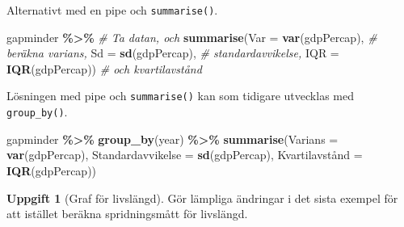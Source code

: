 \documentclass[
]{book}
\newenvironment{Shaded}{\begin{snugshade}}{\end{snugshade}}
\newcommand{\AttributeTok}[1]{\textcolor[rgb]{0.13,0.29,0.53}{#1}}
\newcommand{\CommentTok}[1]{\textcolor[rgb]{0.56,0.35,0.01}{\textit{#1}}}
\newcommand{\FunctionTok}[1]{\textcolor[rgb]{0.13,0.29,0.53}{\textbf{#1}}}
\newcommand{\NormalTok}[1]{#1}
\newcommand{\OtherTok}[1]{\textcolor[rgb]{0.56,0.35,0.01}{#1}}
\newcommand{\SpecialCharTok}[1]{\textcolor[rgb]{0.81,0.36,0.00}{\textbf{#1}}}
\theoremstyle{definition}
\theoremstyle{definition}
\theoremstyle{definition}
\newtheorem{exercise}{Uppgift}[chapter]
\theoremstyle{definition}
\theoremstyle{remark}
\begin{document}
\begin{Shaded}
\end{Shaded}

Alternativt med en pipe och \texttt{summarise()}.

\begin{Shaded}
\begin{Highlighting}[]
\NormalTok{gapminder }\SpecialCharTok{\%\textgreater{}\%}                       \CommentTok{\# Ta datan, och}
  \FunctionTok{summarise}\NormalTok{(}\AttributeTok{Var =} \FunctionTok{var}\NormalTok{(gdpPercap),   }\CommentTok{\# beräkna varians,}
            \AttributeTok{Sd =} \FunctionTok{sd}\NormalTok{(gdpPercap),     }\CommentTok{\# standardavvikelse,}
            \AttributeTok{IQR =} \FunctionTok{IQR}\NormalTok{(gdpPercap))   }\CommentTok{\# och kvartilavstånd}
\end{Highlighting}
\end{Shaded}

Lösningen med pipe och \texttt{summarise()} kan som tidigare utvecklas med \texttt{group\_by()}.

\begin{Shaded}
\begin{Highlighting}[]
\NormalTok{gapminder }\SpecialCharTok{\%\textgreater{}\%}
  \FunctionTok{group\_by}\NormalTok{(year) }\SpecialCharTok{\%\textgreater{}\%}
  \FunctionTok{summarise}\NormalTok{(}\AttributeTok{Varians =} \FunctionTok{var}\NormalTok{(gdpPercap),}
            \AttributeTok{Standardavvikelse =} \FunctionTok{sd}\NormalTok{(gdpPercap),}
\NormalTok{            Kvartilavstånd }\OtherTok{=} \FunctionTok{IQR}\NormalTok{(gdpPercap))}
\end{Highlighting}
\end{Shaded}

\begin{exercise}[Graf för livslängd]
Gör lämpliga ändringar i det sista exempel för att istället beräkna spridningsmått för livslängd.
\end{exercise}
\end{document}
